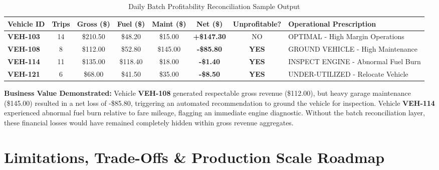 \documentclass[11pt,a4paper]{article}
\begin{document}
\begin{table}[htbp]
\centering
\footnotesize
\caption{Daily Batch Profitability Reconciliation Sample Output}
\label{tab:profitability_sample}
\begin{tabularx}{\textwidth}{l c c c c c c X}
\toprule
\textbf{Vehicle ID} & \textbf{Trips} & \textbf{Gross (\$)} & \textbf{Fuel (\$)} & \textbf{Maint (\$)} & \textbf{Net (\$)} & \textbf{Unprofitable?} & \textbf{Operational Prescription} \\
\midrule
\textbf{VEH-103} & 14 & \$210.50 & \$48.20 & \$15.00 & \textbf{+\$147.30} & NO & OPTIMAL - High Margin Operations \\
\textbf{VEH-108} & 8  & \$112.00 & \$52.80 & \$145.00 & \textbf{-\$85.80} & \textbf{YES} & GROUND VEHICLE - High Maintenance \\
\textbf{VEH-114} & 11 & \$135.00 & \$118.40 & \$18.00 & \textbf{-\$1.40}  & \textbf{YES} & INSPECT ENGINE - Abnormal Fuel Burn \\
\textbf{VEH-121} & 6  & \$68.00  & \$41.50 & \$35.00 & \textbf{-\$8.50}  & \textbf{YES} & UNDER-UTILIZED - Relocate Vehicle \\
\bottomrule
\end{tabularx}
\end{table}

\noindent \textbf{Business Value Demonstrated:} Vehicle \textbf{VEH-108} generated respectable gross revenue (\$112.00), but heavy garage maintenance (\$145.00) resulted in a net loss of -\$85.80, triggering an automated recommendation to ground the vehicle for inspection. Vehicle \textbf{VEH-114} experienced abnormal fuel burn relative to fare mileage, flagging an immediate engine diagnostic. Without the batch reconciliation layer, these financial losses would have remained completely hidden within gross revenue aggregates.

\clearpage
\section{Limitations, Trade-Offs \& Production Scale Roadmap}
\end{document}
